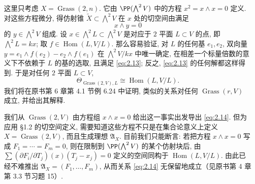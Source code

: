 \begin{example}[Grassmann 簇]\label{exam:tangent-grassmann}
	这里只考虑 $X = \operatorname{Grass}(2, n)$. 它由 $\PP(\bigwedge^2 V)$ 中的方程 $x^2 = x \wedge x = 0$ 定义. 对这些方程微分, 得仿射锥 $\widetilde X \subset \bigwedge^2 V$ 在 $x$ 处的切空间由满足
	\begin{equation}
		\label{eq:2.13}
		x \wedge y = 0
	\end{equation}
	的 $y \in \bigwedge^2 V$ 组成. 设 $x \in \bigwedge^2 L \subset \bigwedge^2 V$ 是对应于 $2$ 平面 $L \subset V$ 的点, 即 $\bigwedge^2 L = k x$; 取 $f \in \operatorname{Hom}(L, V/L)$. 那么容易验证, 对 $L$ 的任何基 $e_1, e_2$, 双向量 $y = e_1 \wedge f(e_2) - e_2 \wedge f(e_1)$ 在 $\bigwedge^2 V / kx$ 中唯一确定, 在相差一个标量倍数的意义下不依赖于 $L$ 的基的选取, 且满足 \eqref{eq:2.13}; 反之, \eqref{eq:2.13} 的任何解都这样得到. 于是对任何 $2$ 平面 $L \subset V$,
	\begin{equation}
		\label{eq:2.14}
		\Theta_{\operatorname{Grass}(2,V),L} \cong \operatorname{Hom}(L, V/L).
	\end{equation}
	我们将在原书第 6 章第 4.1 节例 6.24 中证明, 类似的关系对任何 $\operatorname{Grass}(r, V)$ 成立, 并给出其解释.

	我们从 $\operatorname{Grass}(2, V)$ 由方程组 $x \wedge x = 0$ 给出这一事实出发导出 \eqref{eq:2.14}. 但为应用 §1.2 的切空间定义, 需要知道这些方程不只是在集合论意义上定义 $X = \operatorname{Grass}(2, V)$, 而且生成理想 $\mathfrak A_X$. 目前我们只能断言: 若把方程 $x \wedge x = 0$ 写成 $F_1 = \cdots = F_m = 0$, 则在限制到 $\PP(\bigwedge^2 V)$ 的某个仿射块后, 由 $\sum (\partial F_i/\partial T_j)(x)(T_j - x_j) = 0$ 定义的空间同构于 $\operatorname{Hom}(L, V/L)$. 由此已经不难推出 $\mathfrak A_X = (F_1, \ldots, F_m)$, 从而关系 \eqref{eq:2.14} 无保留地成立（见原书第 4 章第 3.3 节习题 15）.
\end{example}

